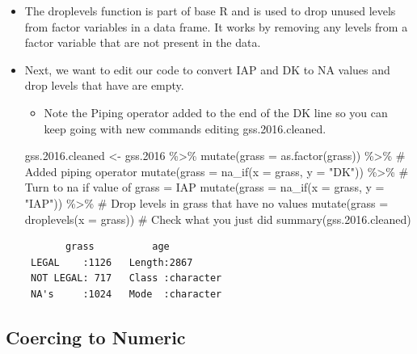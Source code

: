 \documentclass[
  letterpaper,
  DIV=11,
  numbers=noendperiod]{scrreprt}
\newenvironment{Shaded}{\begin{snugshade}}{\end{snugshade}}
\newcommand{\AttributeTok}[1]{\textcolor[rgb]{0.40,0.45,0.13}{#1}}
\newcommand{\CommentTok}[1]{\textcolor[rgb]{0.37,0.37,0.37}{#1}}
\newcommand{\FloatTok}[1]{\textcolor[rgb]{0.68,0.00,0.00}{#1}}
\newcommand{\FunctionTok}[1]{\textcolor[rgb]{0.28,0.35,0.67}{#1}}
\newcommand{\NormalTok}[1]{\textcolor[rgb]{0.00,0.23,0.31}{#1}}
\newcommand{\OtherTok}[1]{\textcolor[rgb]{0.00,0.23,0.31}{#1}}
\newcommand{\SpecialCharTok}[1]{\textcolor[rgb]{0.37,0.37,0.37}{#1}}
\newcommand{\StringTok}[1]{\textcolor[rgb]{0.13,0.47,0.30}{#1}}
\providecommand{\tightlist}{%
  \setlength{\itemsep}{0pt}\setlength{\parskip}{0pt}}\usepackage{longtable,booktabs,array}
\begin{document}
\begin{itemize}
\item
  The droplevels function is part of base R and is used to drop unused
  levels from factor variables in a data frame. It works by removing any
  levels from a factor variable that are not present in the data.
\item
  Next, we want to edit our code to convert IAP and DK to NA values and
  drop levels that have are empty.

  \begin{itemize}
  \tightlist
  \item
    Note the Piping operator added to the end of the DK line so you can
    keep going with new commands editing gss.2016.cleaned.
  \end{itemize}

\begin{Shaded}
\begin{Highlighting}[]
\NormalTok{gss.}\FloatTok{2016.}\NormalTok{cleaned }\OtherTok{\textless{}{-}}\NormalTok{ gss}\FloatTok{.2016} \SpecialCharTok{\%\textgreater{}\%}
    \FunctionTok{mutate}\NormalTok{(}\AttributeTok{grass =} \FunctionTok{as.factor}\NormalTok{(grass)) }\SpecialCharTok{\%\textgreater{}\%}
    \CommentTok{\# Added piping operator}
\FunctionTok{mutate}\NormalTok{(}\AttributeTok{grass =} \FunctionTok{na\_if}\NormalTok{(}\AttributeTok{x =}\NormalTok{ grass, }\AttributeTok{y =} \StringTok{"DK"}\NormalTok{)) }\SpecialCharTok{\%\textgreater{}\%}
    \CommentTok{\# Turn to na if value of grass = IAP}
\FunctionTok{mutate}\NormalTok{(}\AttributeTok{grass =} \FunctionTok{na\_if}\NormalTok{(}\AttributeTok{x =}\NormalTok{ grass, }\AttributeTok{y =} \StringTok{"IAP"}\NormalTok{)) }\SpecialCharTok{\%\textgreater{}\%}
    \CommentTok{\# Drop levels in grass that have no values}
\FunctionTok{mutate}\NormalTok{(}\AttributeTok{grass =} \FunctionTok{droplevels}\NormalTok{(}\AttributeTok{x =}\NormalTok{ grass))}
\CommentTok{\# Check what you just did}
\FunctionTok{summary}\NormalTok{(gss.}\FloatTok{2016.}\NormalTok{cleaned)}
\end{Highlighting}
\end{Shaded}

\begin{verbatim}
       grass          age           
 LEGAL    :1126   Length:2867       
 NOT LEGAL: 717   Class :character  
 NA's     :1024   Mode  :character  
\end{verbatim}
\end{itemize}

\subsection{Coercing to Numeric}\label{coercing-to-numeric}
\end{document}

